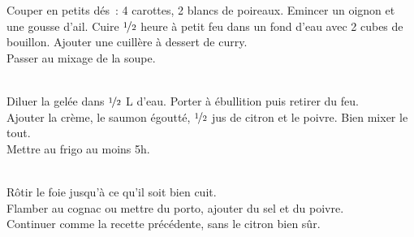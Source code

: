 \begin{minipage}[c]{\textwidth}
Couper en petits dés : 4 carottes, 2 blancs de poireaux. Emincer un oignon et une gousse d’ail. Cuire $\nicefrac{1}{2}$ heure à petit feu dans un fond d’eau avec 2 cubes de bouillon. Ajouter une cuillère à dessert de curry. \\
Passer au mixage de la soupe. \\
\\

\end{minipage}

\begin{minipage}[c]{\textwidth}
Diluer la gelée dans $\nicefrac{1}{2}$ L d’eau. Porter à ébullition puis retirer du feu. \\
Ajouter la crème, le saumon égoutté, $\nicefrac{1}{2}$ jus de citron et le poivre. Bien mixer le tout. \\
Mettre au frigo au moins 5h. \\
\\

\end{minipage}

\begin{minipage}[c]{\textwidth}
Rôtir le foie jusqu’à ce qu’il soit bien cuit. \\
Flamber au cognac ou mettre du porto, ajouter du sel et du poivre. \\
Continuer comme la recette précédente, sans le citron bien sûr. \\
\\

\end{minipage}

